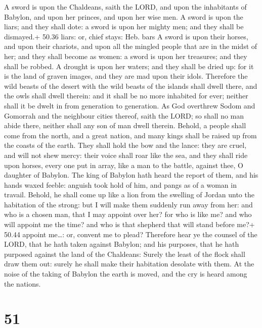  A sword is upon the Chaldeans, saith the LORD, and upon
the inhabitants of Babylon, and upon her princes, and upon her wise men.
 A sword is upon the liars; and they shall dote: a sword is
upon her mighty men; and they shall be dismayed.+ 50.36 liars: or, chief
stays: Heb. bars  A sword is upon their horses, and upon
their chariots, and upon all the mingled people that are in the midst of
her; and they shall become as women: a sword is upon her treasures; and
they shall be robbed.  A drought is upon her waters; and
they shall be dried up: for it is the land of graven images, and they
are mad upon their idols.  Therefore the wild beasts of the
desert with the wild beasts of the islands shall dwell there, and the
owls shall dwell therein: and it shall be no more inhabited for ever;
neither shall it be dwelt in from generation to generation.
 As God overthrew Sodom and Gomorrah and the neighbour
cities thereof, saith the LORD; so shall no man abide there, neither
shall any son of man dwell therein.  Behold, a people shall
come from the north, and a great nation, and many kings shall be raised
up from the coasts of the earth.  They shall hold the bow
and the lance: they are cruel, and will not shew mercy: their voice
shall roar like the sea, and they shall ride upon horses, every one put
in array, like a man to the battle, against thee, O daughter of Babylon.
 The king of Babylon hath heard the report of them, and his
hands waxed feeble: anguish took hold of him, and pangs as of a woman in
travail.  Behold, he shall come up like a lion from the
swelling of Jordan unto the habitation of the strong: but I will make
them suddenly run away from her: and who is a chosen man, that I may
appoint over her? for who is like me? and who will appoint me the time?
and who is that shepherd that will stand before me?+ 50.44 appoint
me\ldots: or, convent me to plead?  Therefore hear ye the
counsel of the LORD, that he hath taken against Babylon; and his
purposes, that he hath purposed against the land of the Chaldeans:
Surely the least of the flock shall draw them out: surely he shall make
their habitation desolate with them.  At the noise of the
taking of Babylon the earth is moved, and the cry is heard among the
nations.

\hypertarget{section-50}{%
\section{51}\label{section-50}}

